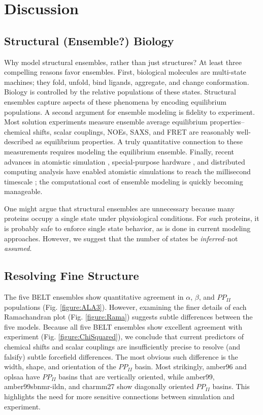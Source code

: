 \documentclass[journal=jacsat,manuscript=article]{achemso}
\begin{document}
\section{Discussion}

\subsection{Structural (Ensemble?) Biology}

Why model structural ensembles, rather than just structures?  At least three compelling reasons favor ensembles.  First, biological molecules are multi-state machines; they fold, unfold, bind ligands, aggregate, and change conformation.  Biology is controlled by the relative populations of these states.  Structural ensembles capture aspects of these phenomena by encoding equilibrium populations.  A second argument for ensemble modeling is fidelity to experiment.  Most solution experiments measure ensemble average equilibrium properties--chemical shifts, scalar couplings, NOEs, SAXS, and FRET are reasonably well-described as equilibrium properties.  A truly quantitative connection to these measurements requires modeling the equilibrium ensemble.  Finally, recent advances in atomistic simulation \cite{hess2008, pronk2013gromacs, eastman2012openmm, eastman2010openmm}, special-purpose hardware \cite{Shaw2008}, and distributed computing analysis \cite{emma, msmb2} have enabled atomistic simulations to reach the 
millisecond 
timescale \cite{voelz2010, bowman2011atomistic, Shaw2010, Shaw2011}; the computational cost of ensemble modeling is quickly becoming manageable.

One might argue that structural ensembles are unnecessary because many proteins occupy a single state under physiological conditions.  For such proteins, it is probably safe to enforce single state behavior, as is done in current modeling approaches. However, we suggest that the number of states be \emph{inferred}--not \emph{assumed}.  


\subsection{Resolving Fine Structure}

The five BELT ensembles show quantitative agreement in $\alpha$, $\beta$, and $PP_{II}$ populations (Fig. \ref{figure:ALA3}).  However, examining the finer details of each Ramachandran plot (Fig. \ref{figure:Rama}) suggests subtle differences between the 
five models.  Because all five BELT ensembles show excellent agreement with experiment (Fig. \ref{figure:ChiSquared}), we conclude that current predictors of chemical shifts and scalar couplings are insufficiently precise to resolve (and falsify) subtle forcefield differences.  The most obvious such difference is the width, shape, and orientation of the $PP_{II}$ basin.  Most strikingly, amber96 and oplsaa have $PP_{II}$ basins that are vertically oriented, while amber99, amber99sbnmr-ildn, and charmm27 show diagonally oriented $PP_{II}$ basins.  This highlights the need for more sensitive connections between simulation and experiment.
\end{document}
